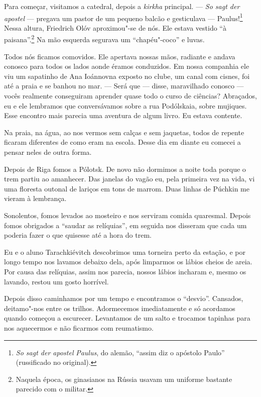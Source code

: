 Para começar, visitamos a catedral, depois a \emph{kirkha} principal.
--- \emph{So sagt der apostel} --- pregava um pastor de um pequeno
balcão e gesticulava --- Paulus!\footnote{\emph{So sagt der apostel} %
  \emph{Paulus}, do alemão, ``assim diz o apóstolo Paulo'' (russificado
  no original).} Nessa altura, Friedrich Olóv aproximou"-se de nós. Ele
estava vestido ``à paisana''.\footnote{Naquela época, os ginasianos na
  Rússia usavam um uniforme bastante parecido com o militar.} Na mão
esquerda segurava um ``chapéu"-coco'' e luvas.

Todos nós ficamos comovidos. Ele apertava nossas mãos, radiante e andava %
conosco para todos os lados aonde éramos conduzidos. Em nossa companhia
ele viu um sapatinho de Ana Ioánnovna exposto no clube, um canal com
cisnes, foi até a praia e se banhou no mar. --- Será que --- disse,
maravilhado conosco --- vocês realmente conseguiram aprender quase todo
o curso de ciências? Abraçados, eu e ele lembramos que conversávamos
sobre a rua Podólskaia, sobre mujiques. Esse encontro mais parecia uma
aventura de algum livro. Eu estava contente.

Na praia, na água, ao nos vermos sem calças e sem jaquetas, todos de
repente ficaram diferentes de como eram na escola. Desse dia em diante
eu comecei a pensar neles de outra forma.

Depois de Riga fomos a Pólotsk. De novo não dormimos a noite toda porque
o trem partiu ao amanhecer. Das janelas do vagão eu, pela primeira vez
na vida, vi uma floresta outonal de lariços em tons de marrom. Duas
linhas de Púchkin me vieram à lembrança.

Sonolentos, fomos levados ao mosteiro e nos serviram comida quaresmal.
Depois fomos obrigados a ``saudar as relíquias'', em seguida nos
disseram que cada um poderia fazer o que quisesse até a hora do trem.

Eu e o aluno Tarachkiévitch descobrimos uma torneira perto da estação, e
por longo tempo nos lavamos debaixo dela, após limparmos os lábios
cheios de areia. Por causa das relíquias, assim nos parecia, nossos
lábios incharam e, mesmo os lavando, restou um gosto horrível.

Depois disso caminhamos por um tempo e encontramos o ``desvio''.
Cansados, deitamo"-nos entre os trilhos. Adormecemos imediatamente e só
acordamos quando começou a escurecer. Levantamos de um salto e trocamos
tapinhas para nos aquecermos e não ficarmos com reumatismo.

